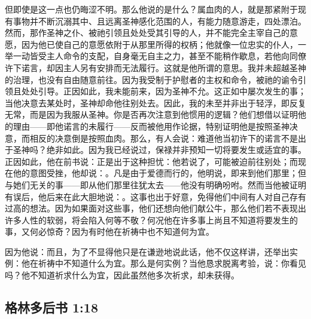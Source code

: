 但即使是这一点也仍晦涩不明。那么他说的是什么？属血肉的人，就是那紧附于现有事物并不断沉溺其中、且远离圣神感化范围的人，有能力随意游走，四处漂泊。然而，那作圣神之仆、被祂引领且处处受其引导的人，并不能完全主宰自己的意愿，因为他已使自己的意愿依附于从那里所得的权柄；他就像一位忠实的仆人，一举一动皆受主人命令的支配，自身毫无自主之力，甚至不能稍作歇息，若他向同僚许下诺言，却因主人另有安排而无法履行。这就是他所谓的意思。我并未超越圣神的治理，也没有自由随意前往。因为我受制于护慰者的主权和命令，被祂的谕令引领且处处引导。正因如此，我未能前来，因为圣神不允。这正如中屡次发生的事；当他决意去某处时，圣神却命他往别处去。因此，我的未至并非出于轻浮，即反复无常，而是因为我服从圣神。你是否再次注意到他惯用的逻辑？他们想借以证明他的理由——即他诺言的未履行——反而被他用作论据，特别证明他是按照圣神决意，而相反的决意倒是按照血肉。那么，有人会说：难道他当初许下的诺言不是出于圣神吗？绝非如此。因为我已经说过，保禄并非预知一切将要发生或适宜的事。正因如此，他在前书说：正是出于这种担忧：他若说了，可能被迫前往别处；而现在他的意图受挫，他却说：。凡是由于爱德而行的，他明说，即来到他们那里；但与她们无关的事——即从他们那里往犹太去——他没有明确吩咐。然而当他被证明有误后，他后来在此大胆地说：。这事也出于好意，免得他们中间有人对自己存有过高的想法。因为如果面对这些事，他们还想向他们献公牛，那么他们若不表现出许多人性的软弱，将会陷入何等不敬？何况他在许多事上尚且不知道将要发生的事，又何必惊奇？因为有时他在祈祷中也不知道何为宜。\par

因为他说：而且，为了不显得他只是在谦逊地说此话，他不仅这样讲，还举出实例：他在祈祷中不知道什么为宜。那么是何实例？当他恳求脱离考验，说：你看见吗？他不知道祈求什么为宜，因此虽然他多次祈求，却未获得。\par


\subsection{格林多后书 1:18}

\par

